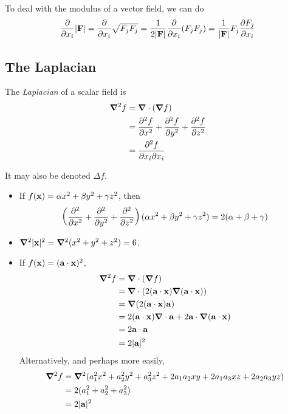\documentclass{../template/note}
\begin{document}
    To deal with the modulus of a vector field, we can do
    \begin{align*}
        \pd{}{x_i} |\V F| = \pd{}{x_i} \sqrt{F_jF_j} = \frac{1}{2|\V F|} \pd{}{x_i} (F_jF_j) = \frac{1}{|\V F|}F_j \pd{F_j}{x_i}
    \end{align*}
    
    \subsection{The Laplacian}

    \begin{definition*}
        The \emph{Laplacian} of a scalar field is
        \begin{align*}
            \grad^2 f &= \grad \cdot (\grad f) \\
            &= \pd{^2f}{x^2} + \pd{^2f}{y^2} + \pd{^2f}{z^2} \\
            &= \pd{^2f}{x_i\partial x_i}
        \end{align*}
    \end{definition*}
    It may also be denoted \(\Delta f\).
    
    \begin{example*}
        \begin{itemize}
            \item If \(f(\V x) = \alpha x^2 + \beta y^2 + \gamma z^2\), then
            \begin{align*}
                \left(\pd{^2}{x^2} + \pd{^2}{y^2} + \pd{^2}{z^2}\right)(\alpha x^2 + \beta y^2 + \gamma z^2) = 2(\alpha + \beta + \gamma)
            \end{align*}
            \item \(\grad^2 |\V x|^2 = \grad^2(x^2+y^2+z^2) = 6\).
            \item If \(f(\V x) = (\V a \cdot \V x)^2\),
            \begin{align*}
                \grad^2 f &= \grad \cdot (\grad f) \\
                &= \grad \cdot (2(\V a \cdot \V x)\grad(\V a \cdot \V x)) \\
                &= \grad (2(\V a \cdot \V x)\V a) \\
                &= 2(\V a \cdot \V x)\grad \cdot \V a + 2 \V a \cdot \grad(\V a \cdot \V x) \\
                &= 2 \V a \cdot \V a \\
                &= 2|\V a|^2
            \end{align*}
            Alternatively, and perhaps more easily,
            \begin{align*}
                \grad^2 f &= \grad^2(a_1^2x^2 + a_2^2y^2 + a_3^2z^2 + 2a_1a_2xy + 2a_1a_3xz + 2a_2a_3yz) \\
                &= 2(a_1^2 + a_2^2 + a_3^2) \\
                &= 2|\V a|^2
            \end{align*}
        \end{itemize}
    \end{example*}
    
\end{document}
